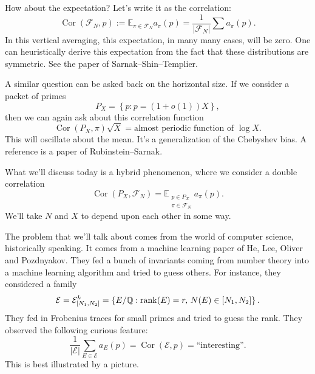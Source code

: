 \documentclass[reqno]{amsart} 
\begin{document}
How about the expectation?  Let's write it as the correlation:
\begin{equation*}
  \operatorname{Cor} (\mathcal{F}_N, p) := \mathbb{E}_{\pi \in \mathcal{F}_N } a_\pi (p)
  = \frac{1}{ \lvert \mathcal{F}_N  \rvert}
  \sum a_\pi (p).
\end{equation*}
In this vertical averaging, this expectation, in many many cases, will be zero.  One can heuristically derive this expectation from the fact that these distributions are symmetric.  See the paper of Sarnak--Shin--Templier.

A similar question can be asked back on the horizontal size.  If we consider a packet of primes
\begin{equation*}
P_X = \left\{ p : p = (1 + o(1)) X \right\},
\end{equation*}
then we can again ask about this correlation function
\begin{equation*}
  \operatorname{Cor} (P_X , \pi )
  \sqrt{X}
  = \text{almost periodic function of } \log X.
\end{equation*}
This will oscillate about the mean.  It's a generalization of the Chebyshev bias.  A reference is a paper of Rubinstein--Sarnak.

What we'll discuss today is a hybrid phenomenon, where we consider a double correlation
\begin{equation*}
  \operatorname{Cor} (P_X, \mathcal{F}_N )
  =
  \mathbb{E}_{
    \substack{
      p \in P_X  \\
       \pi \in \mathcal{F}_N 
    }
  }
  a_\pi (p).
\end{equation*}
We'll take $N$ and $X$ to depend upon each other in some way.

The problem that we'll talk about comes from the world of computer science, historically speaking.  It comes from a machine learning paper of He, Lee, Oliver and Pozdnyakov.  They fed a bunch of invariants coming from number theory into a machine learning algorithm and tried to guess others.  For instance, they considered a family
\begin{equation*}
  \mathcal{E} = \mathcal{E}_{[N _1, N_2]}^k
  = \left\{ E / \mathbb{Q} : \operatorname{rank} (E) = r, \, N(E) \in [N_1, N_2] \right\}.
\end{equation*}
They fed in Frobenius traces for small primes and tried to guess the rank.  They observed the following curious feature:
\begin{equation*}
  \frac{1}{\lvert \mathcal{E}  \rvert}
  \sum_{E \in \mathcal{E} }
  a_E (p)
  = \operatorname{Cor} (\mathcal{E}, p)
  =
  \text{``interesting''}.
\end{equation*}
This is best illustrated by a picture.
\end{document}
